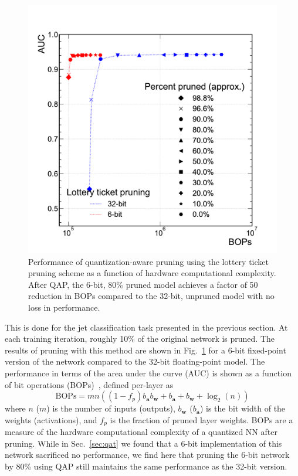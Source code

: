 \documentclass[sigconf]{acmart}
\renewcommand{\vec}[1]{\boldsymbol{#1}}
\begin{document}
\begin{figure}[t!]
\centering
\includegraphics[width=0.7\columnwidth]{Figs/AUCROC_FT_vs_LT_6b32b_v2.pdf}
\caption{Performance of quantization-aware pruning using the lottery ticket pruning scheme as a function of hardware computational complexity.
After QAP, the 6-bit, 80\% pruned model achieves a factor of 50 reduction in BOPs compared to the 32-bit, unpruned model with no loss in performance.}
\label{fig:qap}
\end{figure}

This is done for the jet classification task presented in the previous section.  
At each training iteration, roughly 10\% of the original network is pruned.  
The results of pruning with this method are shown in Fig.~\ref{fig:qap} for a 6-bit fixed-point version of the network compared to the 32-bit floating-point model.
The performance in terms of the area under the curve (AUC) is shown as a function of bit operations (BOPs)~\cite{bops}, defined per-layer as 
\begin{equation}
    \mathrm{BOPs} = mn((1-f_p)b_{\vec{a}}b_{\vec{w}} + b_{\vec{a}} + b_{\vec{w}} + \log_2(n))
\end{equation}
where $n$ ($m$) is the number of inputs (outputs), $b_{\vec{w}}$ ($b_{\vec{a}}$) is the bit width of the weights (activations), and $f_p$ is the fraction of pruned layer weights.
BOPs are a measure of the hardware computational complexity of a quantized NN after pruning.
While in Sec.~\ref{sec:qat} we found that a 6-bit implementation of this network sacrificed no performance, we find here that pruning the 6-bit network by 80\% using QAP still maintains the same performance as the 32-bit version.
\end{document}
